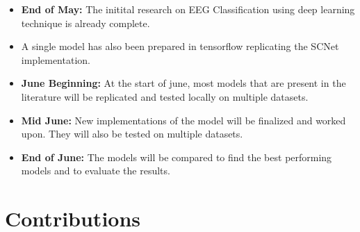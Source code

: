 \documentclass[10pt]{article}
\begin{document}
\begin{center}
\end{center}

\begin{itemize}
    \item \textbf{End of May:} The initital research on EEG Classification using deep learning technique is already complete.
    \item A single model has also been prepared in tensorflow replicating the SCNet implementation.
    \item \textbf{June Beginning:} At the start of june, most models that are present in the literature will be replicated and tested locally on multiple datasets.
    \item \textbf{Mid June:} New implementations of the model will be finalized and worked upon. They will also be tested on multiple datasets.
    \item \textbf{End of June:} The models will be compared to find the best performing models and to evaluate the results.
\end{itemize}














\section{Contributions} 
\end{document}
